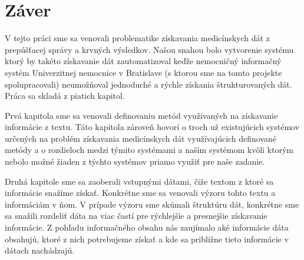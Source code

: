 \chapter*{Záver}  %





V tejto práci sme sa venovali problematike získavania medicínskych dát z prepúšťacej správy a krvných výsledkov. Našou snahou bolo vytvorenie systému ktorý by takéto získavanie dát zautomatizoval keďže nemocničný informačný systém Univerzitnej nemocnice v Bratislave (s ktorou sme na tomto projekte spolupracovali) neumožňoval jednoduché a rýchle získania štrukturovaných dát. Práca sa skladá z piatich kapitol. 

Prvá kapitola sme sa venovali definovaniu metód využívaných na získavanie informácie z textu. Táto kapitola zároveň hovorí o troch už existujúcich systémov určených na problém získavania medicínskych dát využívajúcich definované metódy a o rozdieloch medzi týmito systémami a naším systémom kvôli ktorým nebolo možné žiaden z týchto systémov priamo využiť pre naše zadanie.

Druhá kapitole sme sa zaoberali vstupnými dátami, čiže textom z ktoré sa informácie snažíme získať. Konkrétne sme sa venovali výzoru tohto textu a informáciám v ňom. V prípade výzoru sme skúmali štruktúru dát, konkrétne sme sa snažili rozdeliť dáta na viac častí pre rýchlejšie a presnejšie získavanie informácie. Z pohľadu informačného obsahu nás zaujímalo aké informácie dáta obsahujú, ktoré z nich potrebujeme získať a kde sa približne tieto informácie v dátach nachádzajú.   

